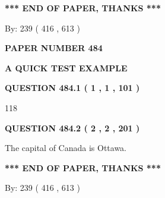 \documentclass[12pt]{article}
\begin{document}
\vspace{1.0in} 
{\textbf{\large{ *** END OF PAPER, THANKS *** }}} 
   
   
\hspace{1.0in} By: 
 239 ( 416 ,  613 )
   
   
   
   
\newpage 
\setcounter{page}{ 
   484001 } 
   
   
   
   
 {\textbf{ \Large{ PAPER NUMBER  484  }}}
   
   
\vspace{0.2in}
   
   
   
   
   
   
 \vspace{0.2in}
{\LARGE {\textbf{ A QUICK TEST EXAMPLE}}}
   
   
  
\vspace{0.2in}
  
{\textbf{\Large{QUESTION
484.1 
 ( 1 , 1 , 101 )
}}}
  
  
 
 
\noindent{}

118
 
 
  
\vspace{0.2in}
  
{\textbf{\Large{QUESTION
484.2 
 ( 2 , 2 , 201 )
}}}
  
  
 
 
\noindent{}
 
 
The capital of Canada is Ottawa.
 
 
 
 
   
   
 \vspace{0.2in}
 
   
   
   
   
\vspace{1.0in} 
{\textbf{\large{ *** END OF PAPER, THANKS *** }}} 
   
   
\hspace{1.0in} By: 
 239 ( 416 ,  613 )
   
\end{document}
